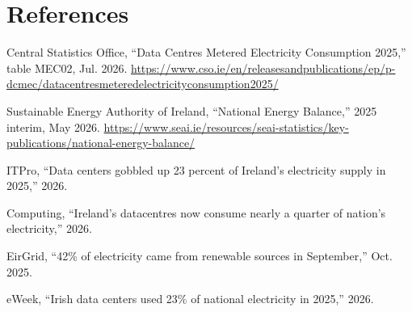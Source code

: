 \documentclass[10pt,twocolumn,a4paper]{article}
\begin{document}
\section*{References}
\footnotesize\raggedright
\begin{enumerate}[label={[\arabic*]},leftmargin=*]
\item Central Statistics Office, ``Data Centres Metered Electricity Consumption 2025,'' table MEC02, Jul. 2026. \url{https://www.cso.ie/en/releasesandpublications/ep/p-dcmec/datacentresmeteredelectricityconsumption2025/}
\item Sustainable Energy Authority of Ireland, ``National Energy Balance,'' 2025 interim, May 2026. \url{https://www.seai.ie/resources/seai-statistics/key-publications/national-energy-balance/}
\item ITPro, ``Data centers gobbled up 23 percent of Ireland's electricity supply in 2025,'' 2026.
\item Computing, ``Ireland's datacentres now consume nearly a quarter of nation's electricity,'' 2026.
\item EirGrid, ``42\% of electricity came from renewable sources in September,'' Oct. 2025.
\item eWeek, ``Irish data centers used 23\% of national electricity in 2025,'' 2026.
\end{enumerate}
\end{document}

